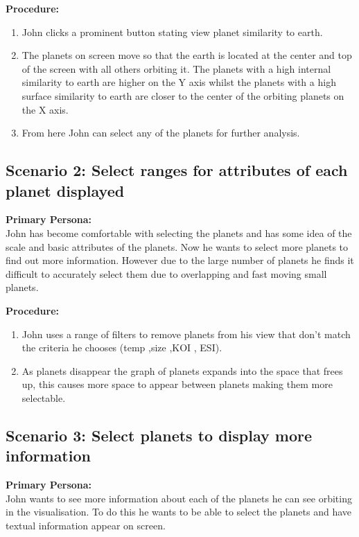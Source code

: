  {\bf Procedure:}
 \begin{enumerate}
 \item John clicks a prominent button stating view planet similarity to earth.
 \item The planets on screen move so that the earth is located at the center and top of the screen with all others orbiting it. The planets with a high internal similarity to earth are higher on the Y axis whilst the planets with a high surface similarity to earth are closer to the center of the orbiting planets on the X axis.
 \item From here John can select any of the planets for further analysis.
 \end{enumerate}
 \subsection{Scenario 2: Select ranges for attributes of each planet displayed}
   {\bf Primary Persona:}\\
 John has become comfortable with selecting the planets and has some idea of the scale and basic attributes of the planets. Now he wants to select more planets to find out more information. However due to the large number of planets he finds it difficult to accurately select them due to overlapping and fast moving small planets.
 
  {\bf Procedure:}
  \begin{enumerate}
 \item John uses a range of filters to remove planets from his view that don't match the criteria he chooses (temp ,size ,KOI , ESI).
\item As planets disappear the graph of planets expands into the space that frees up, this causes more space to appear between planets making them more selectable.
 \end{enumerate}
 \subsection{Scenario 3: Select planets to display more information}
  {\bf  Primary Persona:}\\
 John wants to see more information about each of the planets he can see orbiting in the visualisation. To do this he wants to be able to select the planets and have textual information appear on screen.
 
